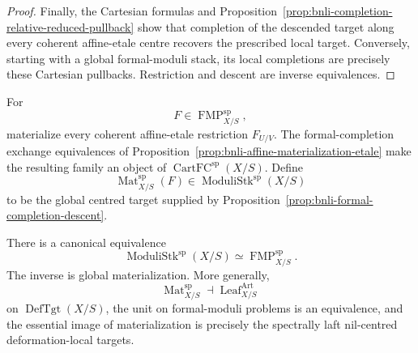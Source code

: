 \begin{proof}
Finally, the Cartesian formulas and
Proposition~\ref{prop:bnli-completion-relative-reduced-pullback} show that
completion of the descended target along every coherent affine-etale centre
recovers the prescribed local target.  Conversely, starting with a global
formal-moduli stack, its local completions are precisely these Cartesian
pullbacks.  Restriction and descent are inverse equivalences.
\end{proof}

\begin{definition}
\label{def:bnli-global-materialization}
For
\[
    F\in\operatorname{FMP}^{\mathrm{sp}}_{X/S},
\]
materialize every coherent affine-etale restriction $F_{U/V}$.  The
formal-completion exchange equivalences of
Proposition~\ref{prop:bnli-affine-materialization-etale} make the resulting
family an object of $\operatorname{CartFC}^{\mathrm{sp}}(X/S)$.  Define
\[
\boxed{
    \operatorname{Mat}^{\mathrm{sp}}_{X/S}(F)
    \in
    \operatorname{ModuliStk}^{\mathrm{sp}}(X/S)}
\]
to be the global centred target supplied by
Proposition~\ref{prop:bnli-formal-completion-descent}.
\end{definition}

\begin{theorem}
\label{thm:bnli-global-materialization}
There is a canonical equivalence
\[
\boxed{
    \operatorname{ModuliStk}^{\mathrm{sp}}(X/S)
    \simeq
    \operatorname{FMP}^{\mathrm{sp}}_{X/S}.}
\]
The inverse is global materialization.  More generally,
\[
    \operatorname{Mat}^{\mathrm{sp}}_{X/S}
    \dashv
    \operatorname{Leaf}^{\mathrm{Art}}_{X/S}
\]
on $\operatorname{DefTgt}(X/S)$, the unit on formal-moduli problems is an
equivalence, and the essential image of materialization is precisely the
spectrally laft nil-centred deformation-local targets.
\end{theorem}

